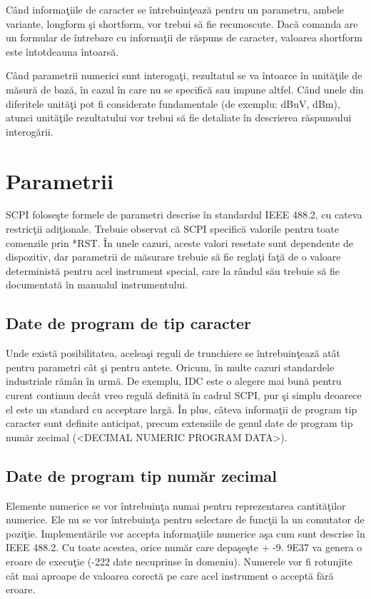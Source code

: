 C\^{a}nd informa\c{t}iile de caracter se \^{i}ntrebuin\c{t}eaz\u{a} pentru un parametru, ambele variante, longform \c{s}i shortform, vor trebui s\u{a} fie recunoscute. Dac\u{a} comanda are un formular de \^{i}ntrebare cu informa\c{t}ii de r\u{a}spuns de caracter, valoarea shortform este \^{i}ntotdeauna \^{i}ntoars\u{a}.

C\^{a}nd parametrii numerici sunt interoga\c{t}i, rezultatul se va \^{i}ntoarce \^{i}n unit\u{a}\c{t}ile de m\u{a}sur\u{a} de baz\u{a}, \^{i}n cazul \^{i}n care nu se specific\u{a} sau impune altfel. C\^{a}nd unele din diferitele unit\u{a}\c{t}i pot fi considerate fundamentale (de exemplu: dBuV, dBm), atunci unit\u{a}\c{t}ile rezultatului vor trebui s\u{a} fie detaliate \^{i}n descrierea r\u{a}spunsului interog\u{a}rii.

\section{Parametrii}
 SCPI folose\c{s}te formele de parametri descrise \^{i}n standardul IEEE 488.2, cu cateva restric\c{t}ii adi\c{t}ionale. Trebuie observat c\u{a} SCPI specific\u{a} valorile pentru toate comenzile prin *RST. \^{I}n unele cazuri, aceste valori resetate sunt dependente de dispozitiv, dar parametrii de m\u{a}surare trebuie s\u{a} fie regla\c{t}i fa\c{t}\u{a} de o valoare determinist\u{a} pentru acel instrument special, care la r\^{a}ndul s\u{a}u trebuie s\u{a} fie documentat\u{a} \^{i}n manualul instrumentului.

\subsection{Date de program de tip caracter}
Unde exist\u{a} posibilitatea, acelea\c{s}i reguli de trunchiere se \^{i}ntrebuin\c{t}eaz\u{a} at\^{a}t pentru parametri c\^{a}t \c{s}i pentru antete. Oricum, \^{i}n multe cazuri standardele industriale r\u{a}m\^{a}n \^{i}n urm\u{a}. De exemplu, IDC este o alegere mai bun\u{a} pentru curent continuu dec\^{a}t vreo regul\u{a} definit\u{a} \^{i}n cadrul SCPI, pur \c{s}i simplu deoarece el este un standard cu acceptare larg\u{a}. \^{I}n plus, c\^{a}teva informa\c{t}ii de program tip caracter sunt definite anticipat, precum extensiile de genul date de program tip num\u{a}r zecimal (\textless  DECIMAL NUMERIC PROGRAM DATA\textgreater).

\subsection{Date de program tip num\u{a}r zecimal}
Elemente numerice se vor \^{i}ntrebuin\c{t}a numai pentru reprezentarea cantit\u{a}\c{t}ilor numerice. Ele nu se vor \^{i}ntrebuin\c{t}a pentru selectare de func\c{t}ii la un comutator de pozi\c{t}ie. Implement\u{a}rile vor accepta informa\c{t}iile numerice a\c{s}a cum sunt descrise \^{i}n IEEE 488.2. Cu toate acestea, orice num\u{a}r care depa\c{s}e\c{s}te + -9. 9E37 va genera o eroare de execu\c{t}ie (-222 date necuprinse \^{i}n domeniu). Numerele vor fi rotunjite c\^{a}t mai aproape de valoarea corect\u{a} pe care acel instrument o accept\u{a} f\u{a}r\u{a} eroare.


